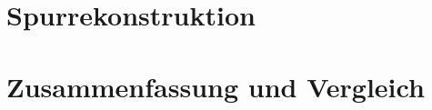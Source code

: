 \documentclass{beamer}
\begin{document}

\section{Spurrekonstruktion}



\section{Zusammenfassung und Vergleich}

\end{document}
